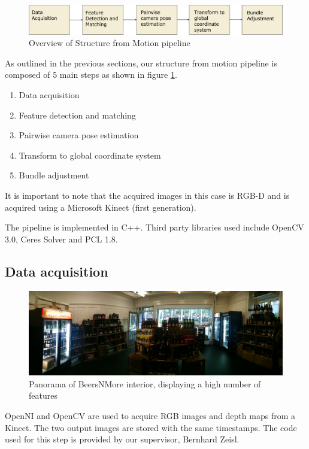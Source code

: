 \documentclass[10pt,twocolumn,letterpaper]{article}
\begin{document}
\begin{figure}[ht]
\begin{center}
   \includegraphics[width=0.9\linewidth]{figures/pipeline.pdf}
\end{center}
\caption{Overview of Structure from Motion pipeline}
\label{fig:pipeline}
\end{figure}

As outlined in the previous sections, our structure from motion pipeline is
composed of 5 main steps as shown in figure \ref{fig:pipeline}.

\begin{enumerate}
\item Data acquisition
\item Feature detection and matching
\item Pairwise camera pose estimation
\item Transform to global coordinate system
\item Bundle adjustment
\end{enumerate}

It is important to note that the acquired images in this case is RGB-D and is
acquired using a Microsoft Kinect (first generation).

The pipeline is implemented in C++. Third party libraries used include OpenCV
3.0, Ceres Solver and PCL 1.8.


\subsection{Data acquisition}
\begin{figure}
\begin{center}
   \includegraphics[width=0.9\linewidth]{figures/BeersNMore_panorama.jpg}
\end{center}
\caption{Panorama of BeersNMore interior, displaying a high number of features}
\label{fig:panorama}
\end{figure}
OpenNI and OpenCV are used to acquire RGB images and depth maps from a Kinect.
The two output images are stored with the same timestamps. The code used for
this step is provided by our supervisor, Bernhard Zeisl.
\end{document}

